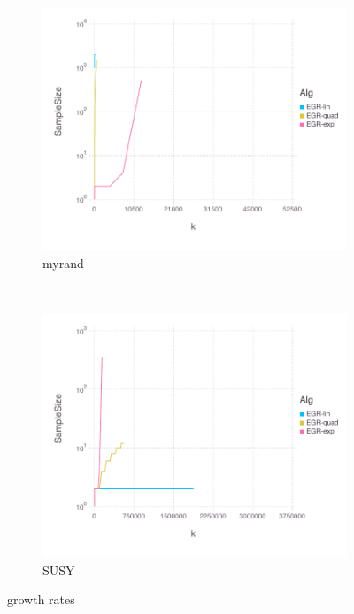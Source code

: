 \documentclass[11pt]{article}
\begin{document}
\begin{figure}[H]
      \begin{subfigure}[b]{0.45\textwidth}
          \includegraphics[width=\textwidth]{Figures/myrandBLtrueSampleSizefFinal.pdf}
          \caption{myrand}
      \end{subfigure}
      ~ %
        \begin{subfigure}[b]{0.45\textwidth}
          \includegraphics[width=\textwidth]{Figures/SUSYBLtrueSampleSizefFinal.pdf}
            \caption{SUSY}
        \end{subfigure}
      \caption{growth rates}\label{fig:alphaGoodsummary}
  \end{figure}
  
\end{document}
